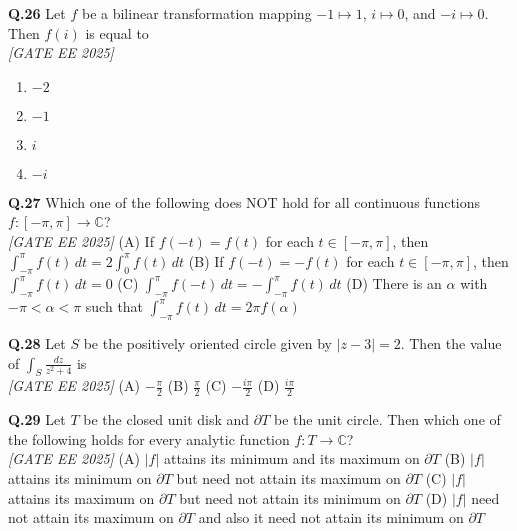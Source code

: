 \documentclass[11pt]{article}
\begin{document}
\vspace{0.5cm}

\noindent\textbf{Q.26}  
Let \(f\) be a bilinear transformation mapping \(-1\mapsto1\), \(i\mapsto 0\), and \(-i\mapsto 0\). Then \(f(i)\) is equal to  
\\[1ex] \textit{[GATE EE 2025]}

\begin{enumerate}[label=(\Alph*)]

\item \(-2\) \item \(-1\) \item \(i\) \item \(-i\)
\end{enumerate}

\begin{flushleft}
\textbf{Q.27} Which one of the following does NOT hold for all continuous functions $f:[-\pi,\pi] \rightarrow \mathbb{C}$?
\\[1ex] \textit{[GATE EE 2025]}
\newline
(A) If $f(-t) = f(t)$ for each $t \in [-\pi, \pi]$, then $\int_{-\pi}^{\pi} f(t)\,dt = 2\int_{0}^{\pi} f(t)\,dt$ \newline
(B) If $f(-t) = -f(t)$ for each $t \in [-\pi, \pi]$, then $\int_{-\pi}^{\pi} f(t)\,dt = 0$ \newline
(C) $\int_{-\pi}^{\pi} f(-t)\,dt = -\int_{-\pi}^{\pi} f(t)\,dt$ \newline
(D) There is an $\alpha$ with $-\pi < \alpha < \pi$ such that $\int_{-\pi}^{\pi} f(t)\,dt = 2\pi f(\alpha)$ \newline

\vspace{5pt}
\textbf{Q.28} Let $S$ be the positively oriented circle given by $|z - 3| = 2$. Then the value of $\int_{S} \frac{dz}{z^2 + 4}$ is
\\[1ex] \textit{[GATE EE 2025]}
\newline
(A) $-\frac{\pi}{2}$ \hspace{12pt}
(B) $\frac{\pi}{2}$ \hspace{12pt}
(C) $-\frac{i\pi}{2}$ \hspace{12pt}
(D) $\frac{i\pi}{2}$ \newline

\vspace{5pt}
\textbf{Q.29} Let $T$ be the closed unit disk and $\partial T$ be the unit circle. Then which one of the following holds for every analytic function $f : T \rightarrow \mathbb{C}$?
\\[1ex] \textit{[GATE EE 2025]}
\newline
(A) $|f|$ attains its minimum and its maximum on $\partial T$ \newline
(B) $|f|$ attains its minimum on $\partial T$ but need not attain its maximum on $\partial T$ \newline
(C) $|f|$ attains its maximum on $\partial T$ but need not attain its minimum on $\partial T$ \newline
(D) $|f|$ need not attain its maximum on $\partial T$ and also it need not attain its minimum on $\partial T$ \newline


\end{flushleft}
\end{document}
